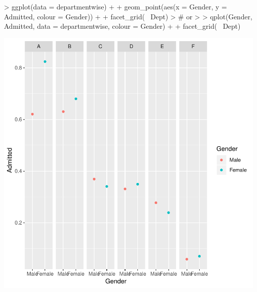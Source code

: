 \documentclass[12pt,letterpaper,final]{article}
\begin{document}
\begin{Schunk}
\begin{Sinput}
> ggplot(data = departmentwise) +
+   geom_point(aes(x = Gender, y = Admitted, colour = Gender)) +
+   facet_grid(~ Dept)
> # or
> 
> qplot(Gender, Admitted, data = departmentwise, colour = Gender) +
+   facet_grid(~ Dept)
\end{Sinput}
\end{Schunk}
\includegraphics{lect_main-032}
\end{document}
